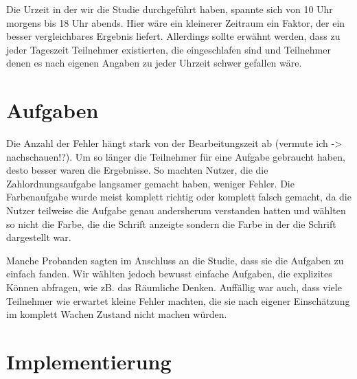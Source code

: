 Die Urzeit in der wir die Studie durchgeführt haben, spannte sich von 10 Uhr morgens bis 18 Uhr abends. Hier wäre ein kleinerer Zeitraum ein Faktor, der ein besser vergleichbares Ergebnis liefert. 
Allerdings sollte erwähnt werden, dass zu jeder Tageszeit Teilnehmer existierten, die eingeschlafen sind und Teilnehmer denen es nach eigenen Angaben zu jeder Uhrzeit schwer gefallen wäre.

\section{Aufgaben}

Die Anzahl der Fehler hängt stark von der Bearbeitungszeit ab (vermute ich -> nachschauen!?). Um so länger die Teilnehmer für eine Aufgabe gebraucht haben, desto besser waren die Ergebnisse. So machten Nutzer, die die Zahlordnungsaufgabe langsamer gemacht haben, weniger Fehler. Die Farbenaufgabe wurde meist komplett richtig oder komplett falsch gemacht, da die Nutzer teilweise die Aufgabe genau andersherum verstanden hatten und wählten so nicht die Farbe, die die Schrift anzeigte sondern die Farbe in der die Schrift dargestellt war.

Manche Probanden sagten im Anschluss an die Studie, dass sie die Aufgaben zu einfach fanden. Wir wählten jedoch bewusst einfache Aufgaben, die explizites Können abfragen, wie zB. das Räumliche Denken. Auffällig war auch, dass viele Teilnehmer wie erwartet kleine Fehler machten, die sie nach eigener Einschätzung im komplett Wachen Zustand nicht machen würden. 


\section{Implementierung}


